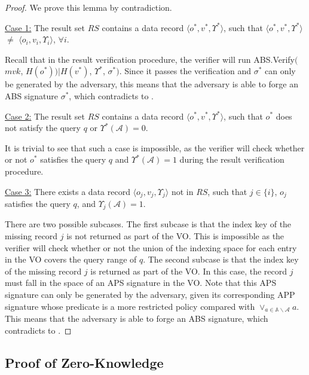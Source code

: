 \begin{proof}
    We prove this lemma by contradiction.

    \noindent\underline{Case 1:} The result set $RS$ contains a data record $\langle o^*, v^*, \Upsilon^*\rangle$, such that $\langle o^*, v^*, \Upsilon^*\rangle$ $\neq$ $\langle o_i, v_i, \Upsilon_i\rangle$, $\forall i$.

    Recall that in the result verification procedure, the verifier will run \textsf{ABS.Verify}$($$mvk$, $H(o^*))|H(v^*)$, $\Upsilon^*$, $\sigma^*)$. Since it passes the verification and $\sigma^*$ can only be generated by the adversary, this means that the adversary is able to forge an ABS signature $\sigma^*$, which contradicts to .

    \noindent\underline{Case 2:} The result set $RS$ contains a data record $\langle o^*, v^*, \Upsilon^*\rangle$, such that $o^*$ does not satisfy the query $q$ or $\Upsilon^*(\mathcal{A}) = 0$.

    It is trivial to see that such a case is impossible, as the verifier will check whether or not $o^*$ satisfies the query $q$ and $\Upsilon^*(\mathcal{A}) = 1$ during the result verification procedure.

    \noindent\underline{Case 3:} There exists a data record $\langle o_j, v_j, \Upsilon_j\rangle$ not in $RS$, such that $j \in \{i\}$, $o_j$ satisfies the query $q$, and $\Upsilon_j(\mathcal{A})= 1$.

    There are two possible subcases. The first subcase is that the index key of the missing record $j$ is not returned as part of the VO. This is impossible as the verifier will check whether or not the union of the indexing space for each entry in the VO covers the query range of $q$. The second subcase is that the index key of the missing record $j$ is returned as part of the VO. In this case, the record $j$ must fall in the space of an APS signature in the VO. Note that this APS signature can only be generated by the adversary, given its corresponding APP signature whose predicate is a more restricted policy compared with $\lor_{a \in \mathbb{A}\backslash\mathcal{A}} a$.
   This means that the adversary is able to forge an ABS signature,
   which contradicts to .
\end{proof}

\subsection{Proof of Zero-Knowledge}

